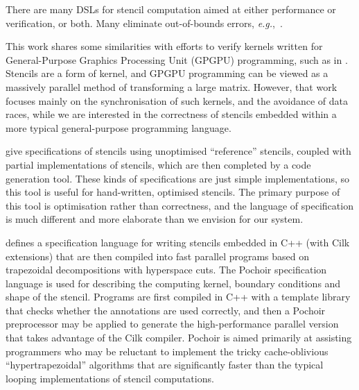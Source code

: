 \documentclass[9pt]{sigplanconf}
\theoremstyle{definition}
\newcommand{\eg}{\emph{e.g.}}
\begin{document}

There are many DSLs for stencil computation aimed at either
performance or verification, or both. Many eliminate out-of-bounds
errors, \eg{},~\citet{DBLP:journals/corr/abs-1109-0777}.

This work shares some similarities with efforts to verify kernels
written for General-Purpose Graphics Processing Unit (GPGPU)
programming, such as in \citet{Blom:2014:SoCP}. Stencils are a form of
kernel, and GPGPU programming can be viewed as a massively parallel
method of transforming a large matrix. However, that work focuses
mainly on the synchronisation of such kernels, and the avoidance of
data races, while we are interested in the correctness of stencils
embedded within a more typical general-purpose programming language.

\citet{Solar-Lezama:2007:PLDI} give specifications of stencils using
unoptimised ``reference'' stencils, coupled with partial
implementations of stencils, which are then completed by a code
generation tool. These kinds of specifications are just simple
implementations, so this tool is useful for hand-written, optimised
stencils. The primary purpose of this tool is optimisation rather than
correctness, and the language of specification is much different and
more elaborate than we envision for our system.

\citet{Tang:2011:SPAA} defines a specification language for writing
stencils embedded in C++ (with Cilk extensions) that are then compiled
into fast parallel programs based on trapezoidal decompositions with
hyperspace cuts. The Pochoir specification language is used for
describing the computing kernel, boundary conditions and shape of the
stencil. Programs are first compiled in C++ with a template library
that checks whether the annotations are used correctly, and then a
Pochoir preprocessor may be applied to generate the high-performance
parallel version that takes advantage of the Cilk compiler.  Pochoir
is aimed primarily at assisting programmers who may be reluctant to
implement the tricky cache-oblivious ``hypertrapezoidal'' algorithms
that are significantly faster than the typical looping implementations
of stencil computations.

\citet{Zhang:2012:CGO}

\citet{Orchard:2010:DAMP}


\end{document}
